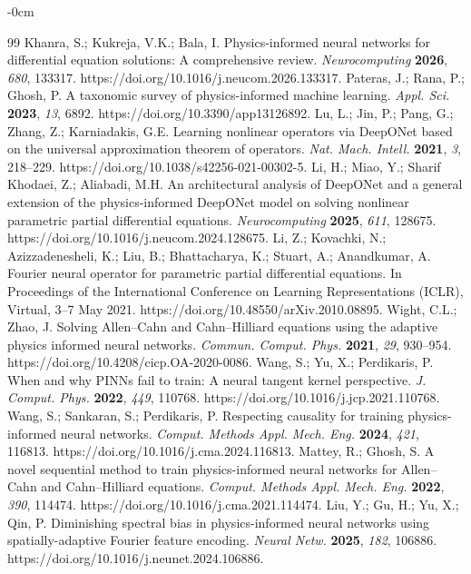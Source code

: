 \begin{adjustwidth}{-\extralength}{0cm}
\begin{thebibliography}{99}
 Khanra, S.; Kukreja, V.K.; Bala, I. Physics-informed neural networks for differential equation solutions: A comprehensive review. \textit{Neurocomputing} \textbf{2026}, \textit{680}, 133317. https://doi.org/10.1016/j.neucom.2026.133317.
 Pateras, J.; Rana, P.; Ghosh, P. A taxonomic survey of physics-informed machine learning. \textit{Appl. Sci.} \textbf{2023}, \textit{13}, 6892. https://doi.org/10.3390/app13126892.
 Lu, L.; Jin, P.; Pang, G.; Zhang, Z.; Karniadakis, G.E. Learning nonlinear operators via DeepONet based on the universal approximation theorem of operators. \textit{Nat. Mach. Intell.} \textbf{2021}, \textit{3}, 218--229. https://doi.org/10.1038/s42256-021-00302-5.
 Li, H.; Miao, Y.; Sharif Khodaei, Z.; Aliabadi, M.H. An architectural analysis of DeepONet and a general extension of the physics-informed DeepONet model on solving nonlinear parametric partial differential equations. \textit{Neurocomputing} \textbf{2025}, \textit{611}, 128675. https://doi.org/10.1016/j.neucom.2024.128675.
 Li, Z.; Kovachki, N.; Azizzadenesheli, K.; Liu, B.; Bhattacharya, K.; Stuart, A.; Anandkumar, A. Fourier neural operator for parametric partial differential equations. In Proceedings of the International Conference on Learning Representations (ICLR), Virtual, 3--7 May 2021. https://doi.org/10.48550/arXiv.2010.08895.
 Wight, C.L.; Zhao, J. Solving Allen--Cahn and Cahn--Hilliard equations using the adaptive physics informed neural networks. \textit{Commun. Comput. Phys.} \textbf{2021}, \textit{29}, 930--954. https://doi.org/10.4208/cicp.OA-2020-0086.
 Wang, S.; Yu, X.; Perdikaris, P. When and why PINNs fail to train: A neural tangent kernel perspective. \textit{J. Comput. Phys.} \textbf{2022}, \textit{449}, 110768. https://doi.org/10.1016/j.jcp.2021.110768.
 Wang, S.; Sankaran, S.; Perdikaris, P. Respecting causality for training physics-informed neural networks. \textit{Comput. Methods Appl. Mech. Eng.} \textbf{2024}, \textit{421}, 116813. https://doi.org/10.1016/j.cma.2024.116813.
 Mattey, R.; Ghosh, S. A novel sequential method to train physics-informed neural networks for Allen--Cahn and Cahn--Hilliard equations. \textit{Comput. Methods Appl. Mech. Eng.} \textbf{2022}, \textit{390}, 114474. https://doi.org/10.1016/j.cma.2021.114474.
 Liu, Y.; Gu, H.; Yu, X.; Qin, P. Diminishing spectral bias in physics-informed neural networks using spatially-adaptive Fourier feature encoding. \textit{Neural Netw.} \textbf{2025}, \textit{182}, 106886. https://doi.org/10.1016/j.neunet.2024.106886.

\end{thebibliography}
\end{adjustwidth}
